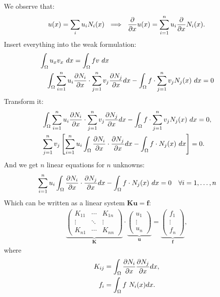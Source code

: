 \begin{multicols}{2}
We observe that:
\begin{align*}
u(x) = \sum_i u_i N_i(x) \ \implies \ {\partial \over \partial x} u(x) = \sum_{i=1}^n  u_i  {\partial \over \partial x} N_i(x).
\end{align*}
Insert everything into the weak formulation:
\begin{align*}
	&\int_\Omega u_x v_x\ dx = \int_\Omega fv\ dx\\
	&\quad \int_\Omega \sum_{i=1}^n u_i {\partial N_i \over \partial x} \cdot \sum_{j=1}^n v_j {\partial N_j \over \partial x} dx - \int_\Omega f \cdot \sum_{j=1}^n v_j N_j(x)\ dx = 0
\end{align*}
Transform it:
\begin{align*}
	&\int_\Omega \sum_{i=1}^n u_i {\partial N_i \over \partial x} \cdot \sum_{j=1}^n v_j {\partial N_j \over \partial x} dx - \int_\Omega f \cdot \sum_{j=1}^n v_j N_j(x)\ dx = 0,\\
	&\sum_{j=1}^n v_j \left[\sum_{i=1}^n u_i \int_\Omega {\partial N_i \over \partial x} \cdot {\partial N_j \over \partial x} dx - \int_\Omega f \cdot N_j(x)\ dx \right] = 0.
\end{align*}
And we get $n$ linear equations for $n$ unknowns:
\begin{align*}
&\sum_{i=1}^n u_i \int_\Omega {\partial N_i \over \partial x} \cdot {\partial N_j \over \partial x} dx - \int_\Omega f \cdot N_j(x)\ dx = 0 &\forall i=1,\ldots, n
\end{align*}
Which can be written as a linear system $\mathbf{Ku} = \mathbf{f}$:
\begin{align*}
\underbrace{
\begin{pmatrix}
K_{11} & \cdots & K_{1n}\\
\vdots & \ddots & \vdots\\
K_{n1} & \cdots & K_{nn}
\end{pmatrix}}_\mathbf{K} \cdot  
\underbrace{
\begin{pmatrix}
u_1\\ \vdots \\ u_n
\end{pmatrix}
}_\mathbf{u}
= 
\underbrace{
\begin{pmatrix}
f_1\\ \vdots \\ f_n
\end{pmatrix}
}_\mathbf{f},
\end{align*}
where
\begin{align*}
	K_{ij} &= \int_\Omega {\partial N_i \over \partial x} {\partial N_j \over \partial x} dx,\\
	f_i &= \int_\Omega f\ N_i(x)dx.
\end{align*}


\end{multicols}
